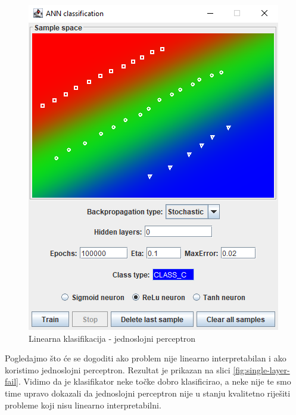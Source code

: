 \documentclass[times, utf8, zavrsni]{fer}
\begin{document}
\begin{figure}[H]
    \centering
    \includegraphics[scale=0.6]{img/single-layer.png}
    \caption[Caption for LOF]{Linearna klasifikacija - jednoslojni perceptron}
    \label{fig:single-layer-class}
\end{figure}

Pogledajmo što će se dogoditi ako problem nije linearno interpretabilan i ako koristimo jednoslojni perceptron. Rezultat je prikazan na slici \ref{fig:single-layer-fail}. Vidimo da je klasifikator neke točke dobro klasificirao, a neke nije te smo time upravo dokazali da jednoslojni perceptron nije u stanju kvalitetno riješiti probleme koji nisu linearno interpretabilni.
\end{document}
